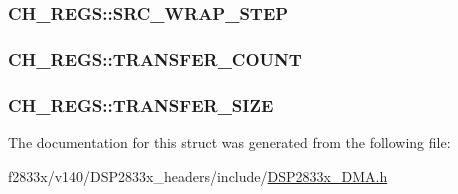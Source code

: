 \subsubsection[{S\+R\+C\+\_\+\+W\+R\+A\+P\+\_\+\+S\+T\+E\+P}]{ C\+H\+\_\+\+R\+E\+G\+S\+::\+S\+R\+C\+\_\+\+W\+R\+A\+P\+\_\+\+S\+T\+E\+P}\label{struct_c_h___r_e_g_s_a7df55f552fc8d302646eb6c6a05951f0}
\hypertarget{struct_c_h___r_e_g_s_ae29bd6656de24b37227deab48f2e246d}{}
\subsubsection[{T\+R\+A\+N\+S\+F\+E\+R\+\_\+\+C\+O\+U\+N\+T}]{ C\+H\+\_\+\+R\+E\+G\+S\+::\+T\+R\+A\+N\+S\+F\+E\+R\+\_\+\+C\+O\+U\+N\+T}\label{struct_c_h___r_e_g_s_ae29bd6656de24b37227deab48f2e246d}
\hypertarget{struct_c_h___r_e_g_s_af98f798dbc69de38d844be4c7ce824d9}{}
\subsubsection[{T\+R\+A\+N\+S\+F\+E\+R\+\_\+\+S\+I\+Z\+E}]{ C\+H\+\_\+\+R\+E\+G\+S\+::\+T\+R\+A\+N\+S\+F\+E\+R\+\_\+\+S\+I\+Z\+E}\label{struct_c_h___r_e_g_s_af98f798dbc69de38d844be4c7ce824d9}


The documentation for this struct was generated from the following file\+:\begin{DoxyCompactItemize}
\item 
f2833x/v140/\+D\+S\+P2833x\+\_\+headers/include/\hyperlink{_d_s_p2833x___d_m_a_8h}{D\+S\+P2833x\+\_\+\+D\+M\+A.\+h}\end{DoxyCompactItemize}
